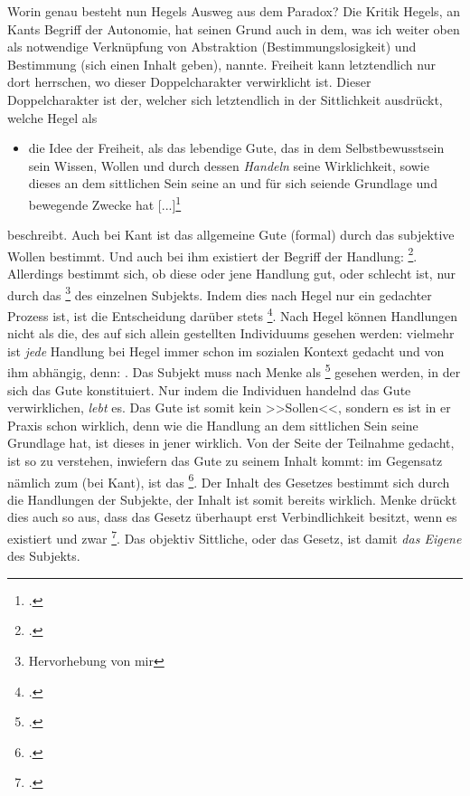 \documentclass[12pt, a4paper, openany]{report}
\begin{document}
Worin genau besteht nun Hegels Ausweg aus dem Paradox?
Die Kritik Hegels, an Kants Begriff der Autonomie, hat seinen Grund auch in dem, was ich weiter oben als notwendige Verknüpfung von Abstraktion (Bestimmungslosigkeit) und Bestimmung (sich einen Inhalt geben), nannte. 
Freiheit kann letztendlich nur dort herrschen, wo dieser Doppelcharakter verwirklicht ist.
Dieser Doppelcharakter ist der, welcher sich letztendlich in der Sittlichkeit ausdrückt, welche Hegel als 
\begin{itemize}
    \item[] die Idee der Freiheit, als das lebendige Gute, das in dem Selbstbewusstsein sein Wissen, Wollen und durch dessen \textit{Handeln} seine Wirklichkeit, sowie dieses an dem sittlichen Sein seine an und für sich seiende Grundlage und bewegende Zwecke hat [...]\footcite[][§142, S. 161. Hervorhebung von mir]{hegel_grundlinien_2017} 
\end{itemize}
beschreibt.
Auch bei Kant ist das allgemeine Gute (formal) durch das subjektive Wollen bestimmt. 
Und auch bei ihm existiert der Begriff der Handlung: \footcite[][S. 51. Hervorhebung von mir.]{kant_kritik_2014}.
Allerdings bestimmt sich, ob diese oder jene Handlung gut, oder schlecht ist, nur durch das \footnote{Hervorhebung von mir} des einzelnen Subjekts.
Indem dies nach Hegel nur ein gedachter Prozess ist, ist die Entscheidung darüber stets \footcite[][136]{hegel_grundlinien_2017}.
Nach Hegel können Handlungen nicht als die, des auf sich allein gestellten Individuums gesehen werden:
vielmehr ist \emph{jede} Handlung bei Hegel immer schon im sozialen Kontext gedacht und von ihm abhängig, denn:
.
Das Subjekt muss nach Menke als \footcite[][28]{menke_autonomie_2018} gesehen werden, in der sich das Gute konstituiert.
Nur indem die Individuen handelnd das Gute verwirklichen, \emph{lebt} es.
Das Gute ist somit kein >>Sollen<<, sondern es ist in er Praxis schon wirklich, denn wie die Handlung an dem sittlichen Sein seine Grundlage hat, ist dieses in jener wirklich.
Von der Seite der Teilnahme gedacht, ist so zu verstehen, inwiefern das Gute zu seinem Inhalt kommt: 
im Gegensatz nämlich zum  (bei Kant), ist das \footcite[][§144, S. 161.]{hegel_grundlinien_2017}.
Der Inhalt des Gesetzes bestimmt sich durch die Handlungen der Subjekte, der Inhalt ist somit bereits wirklich.
Menke drückt dies auch so aus, dass das Gesetz überhaupt erst Verbindlichkeit besitzt, wenn es existiert und zwar \footcite[][57]{menke_autonomie_2018}.
Das objektiv Sittliche, oder das Gesetz, ist damit \emph{das Eigene} des Subjekts.
\end{document}
